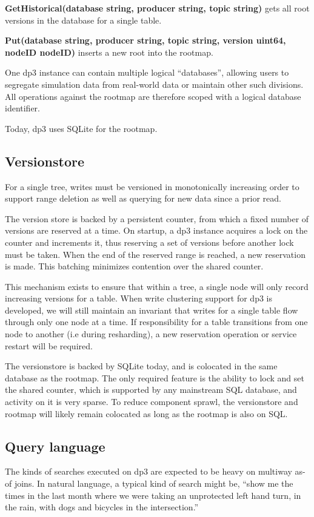 \documentclass[9pt,twocolumn]{article}
\newcommand{\q}[1]{``#1''}
\begin{document}
    \textbf{GetHistorical(database string, producer string, topic string)} gets
    all root versions in the database for a single table.

    \textbf{Put(database string, producer string, topic string, version uint64,
    nodeID nodeID)} inserts a new root into the rootmap.

    One dp3 instance can contain multiple logical \q{databases}, allowing users to
    segregate simulation data from real-world data or maintain other such
    divisions. All operations against the rootmap are therefore scoped with a
    logical database identifier.

    Today, dp3 uses SQLite \cite{sqlite} for the rootmap.

    \subsection{Versionstore}
    For a single tree, writes must be versioned in monotonically increasing order
    to support range deletion as well as querying for new data since a prior read.

    The version store is backed by a persistent counter, from which a fixed
    number of versions are reserved at a time. On startup, a dp3 instance
    acquires a lock on the counter and increments it, thus reserving a set of
    versions before another lock must be taken. When the end of the
    reserved range is reached, a new reservation is made. This batching
    minimizes contention over the shared counter.

    This mechanism exists to ensure that within a tree, a single node will only
    record increasing versions for a table. When write clustering support for dp3
    is developed, we will still maintain an invariant that writes for a single
    table flow through only one node at a time. If responsibility for a table
    transitions from one node to another (i.e during resharding), a new
    reservation operation or service restart will be required.

    The versionstore is backed by SQLite today, and is colocated in the same
    database as the rootmap. The only required feature is the ability to lock and
    set the shared counter, which is supported by any mainstream SQL database,
    and activity on it is very sparse. To reduce component sprawl, the
    versionstore and rootmap will likely remain colocated as long as the rootmap
    is also on SQL.

    \subsection{Query language}
    The kinds of searches executed on dp3 are expected to be heavy on multiway
    as-of joins. In natural language, a typical kind of search might be, \q{show me
    the times in the last month where we were taking an unprotected left hand turn,
    in the rain, with dogs and bicycles in the intersection.}
\end{document}
